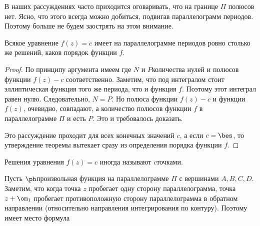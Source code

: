 \documentclass[a4paper]{article}
\begin{document}
\begin{note}
В наших рассуждениях часто приходится оговаривать, что на границе $\Pi$ полюсов нет.
Ясно, что этого всегда можно добиться, подвигав параллелограмм периодов.
Поэтому больше не будем заострять на этом внимание.
\end{note}

\begin{theorem}
Всякое уравнение $f(z) = c$ имеет на параллелограмме периодов ровно столько же решений,
каков порядок функции $f$.
\end{theorem}
\begin{proof}
По принципу аргумента имеем
где $N$ и $P$\т количества нулей и полюсов функции $f(z) - c$ соответственно.
Заметим, что под интегралом стоит эллиптическая функция того же периода, что и функция $f$. Поэтому
этот интеграл равен нулю. Следовательно, $N = P$. Но полюса функции
$f(z) - c$ и функции $f(z)$, очевидно, совпадают, а количество полюсов функции $f$ в параллелограмме
$\Pi$ и есть $P$. Это и требовалось доказать.

Это рассуждение проходит для всех конечных значений $c$, а если $c = \bes$, то утверждение
теоремы вытекает сразу из определения порядка функции $f$.
\end{proof}

\begin{df}
Решения уравнения $f(z) = c$ иногда называют $c$\д точками.
\end{df}

\begin{note}
Пусть $\ph$\т произвольная функция на параллелограмме $\Pi$ с вершинами $A,B,C,D$. Заметим,
что когда точка $z$ пробегает одну сторону параллелограмма, точка $z +\om_1$ пробегает
противоположную сторону параллелограмма в обратном направлении (относительно направления
интегрирования по контуру). Поэтому имеет место формула
\end{note}
\end{document}
